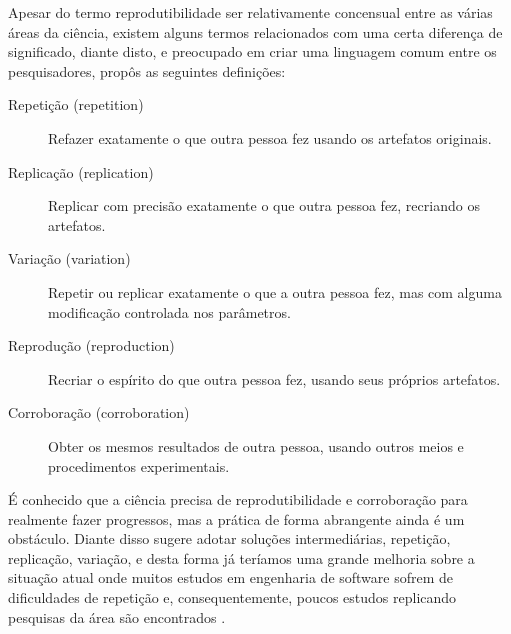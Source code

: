 Apesar do termo reprodutibilidade ser relativamente concensual entre as várias
áreas da ciência, existem alguns termos relacionados com uma certa diferença
de significado, diante disto, e preocupado em criar uma linguagem comum entre
os pesquisadores,  propôs as seguintes definições:

\begin{description}

  \item[Repetição (repetition)]
  Refazer exatamente o que outra pessoa fez usando os artefatos originais.

  \item[Replicação (replication)]
  Replicar com precisão exatamente o que outra pessoa fez, recriando os
  artefatos.

  \item[Variação (variation)]
  Repetir ou replicar exatamente o que a outra pessoa fez, mas com alguma
  modificação controlada nos parâmetros.

  \item[Reprodução (reproduction)]
  Recriar o espírito do que outra pessoa fez, usando seus próprios artefatos.

  \item[Corroboração (corroboration)]
  Obter os mesmos resultados de outra pessoa, usando outros meios e
  procedimentos experimentais.

\end{description}

É conhecido que a ciência precisa de reprodutibilidade e corroboração para
realmente fazer progressos, mas a prática de forma abrangente ainda é um
obstáculo. Diante disso  sugere adotar soluções
intermediárias, repetição, replicação, variação, e desta forma já teríamos uma
grande melhoria sobre a situação atual onde muitos estudos em engenharia de
software sofrem de dificuldades de repetição \cite{Tang2016} e,
consequentemente, poucos estudos replicando pesquisas da área são encontrados
\cite{da2011replication}.


